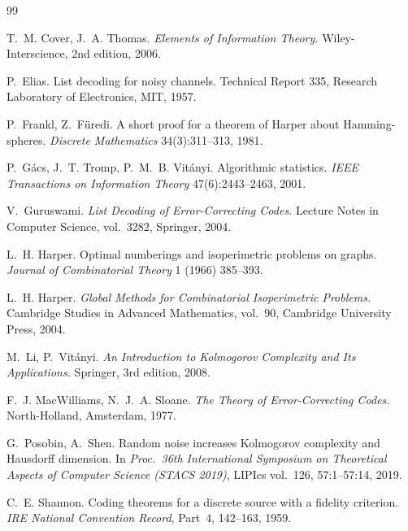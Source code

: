 \documentclass[11pt,a4paper]{article}
\theoremstyle{definition}
\begin{document}
\begin{thebibliography}{99}



 T.~M. Cover, J.~A. Thomas. \emph{Elements of Information
  Theory.} Wiley-Interscience, 2nd edition, 2006.

 P.~Elias. List decoding for noisy channels. Technical
  Report 335, Research Laboratory of Electronics, MIT, 1957.

 P.~Frankl, Z.~F\"uredi. A short proof for a theorem of Harper
  about Hamming-spheres. \emph{Discrete Mathematics} 34(3):311--313, 1981.

 P.~G\'acs, J.~T. Tromp, P.~M.~B. Vit\'anyi. Algorithmic
  statistics. \emph{IEEE Transactions on Information Theory}
  47(6):2443--2463, 2001.

 V.~Guruswami. \emph{List Decoding of Error-Correcting
  Codes.} Lecture Notes in Computer Science, vol.~3282, Springer, 2004.

 L.~H. Harper. Optimal numberings and isoperimetric problems
  on graphs. \emph{Journal of Combinatorial Theory} 1 (1966) 385--393.

 L.~H. Harper. \emph{Global Methods for Combinatorial
  Isoperimetric Problems.} Cambridge Studies in Advanced Mathematics, vol.~90,
  Cambridge University Press, 2004.

 M.~Li, P.~Vit\'anyi. \emph{An Introduction to Kolmogorov
  Complexity and Its Applications.} Springer, 3rd edition, 2008.

 F.~J. MacWilliams, N.~J.~A. Sloane. \emph{The Theory of
  Error-Correcting Codes.} North-Holland, Amsterdam, 1977.

 G.~Posobin, A.~Shen. Random noise increases Kolmogorov
  complexity and Hausdorff dimension. In \emph{Proc.\ 36th International
  Symposium on Theoretical Aspects of Computer Science (STACS 2019)},
  LIPIcs vol.~126, 57:1--57:14, 2019.

 C.~E. Shannon. Coding theorems for a discrete source with
  a fidelity criterion. \emph{IRE National Convention Record}, Part~4,
  142--163, 1959.


\end{thebibliography}
\end{document}
